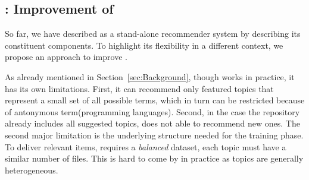 %
%
%
%



\subsection{\TFb: Improvement of \MNB} \label{sec:combined_approach}

So far, we have described \TF as a stand-alone recommender system by describing its constituent components. To highlight its flexibility in a different context, we propose an approach to improve \MNB. 

As already mentioned in Section~\ref{sec:Background}, though \MNB works in practice, it has its own limitations. First, it can recommend only featured topics that represent a small set of all possible terms, which in turn can be restricted because of antonymous term(\eg programming languages). Second, in the case the repository already includes all suggested topics, \MNB does not able to recommend new ones. The second major limitation is the underlying structure needed for the training phase. To deliver relevant items, \MNB requires a \emph{balanced} dataset, \ie each topic must have a similar number of  \RM files. This is hard to come by in practice as topics are generally heterogeneous.










